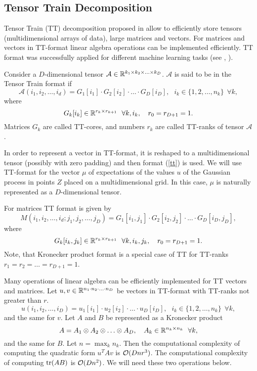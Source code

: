\subsection{Tensor Train Decomposition}
\label{tensor_train}

  Tensor Train (TT) decomposition proposed in \citet{oseledets2011} allow to
  efficiently store tensors (multidimensional arrays of data), large matrices and
  vectors. For matrices and vectors in TT-format linear algebra operations
  can be implemented efficiently. TT format was successfully applied for
  different machine learning tasks (see \citet{novikov2014}, \citet{novikov2015}).

  Consider a $D$-dimensional tensor $\mathcal A \in \mathbb{R}^{k_1 \times k_2 \times \ldots \times k_D}$.
  $\mathcal{A}$ is said to be in the Tensor Train format if
  \begin{equation}
  \label{tt}
    \mathcal{A}(i_1, i_2, \ldots, i_d) = G_1[i_1] \cdot G_2[i_2] \cdot \ldots \cdot G_D[i_D],~~~
    i_k \in \{1, 2, \ldots, n_k\}~~\forall k,
  \end{equation}
  where
  \[
    G_k[i_k] \in \mathbb{R}^{r_k\times r_{k+1}}~~\forall k, i_k,~~~r_0 = r_{D+1} = 1.
  \]
  Matrices $G_k$ are called TT-cores, and numbers $r_k$ are called TT-ranks of
  tensor $\mathcal{A}$.

  In order to represent a vector in TT-format, it is reshaped to a multidimensional
  tensor (possibly with zero padding) and then format (\ref{tt}) is used. We will
  use TT-format for the vector $\mu$ of expectations of the values $u$ of the
  Gaussian process in points $Z$ placed on a multidimensional grid. In this case,
  $\mu$ is naturally represented as a $D$-dimensional tensor.

  For matrices TT format is given by
  \[
    M(i_1, i_2, \ldots, i_d; j_1, j_2, \ldots, j_D) = G_1 [i_1, j_1] \cdot
    G_2[i_2, j_2] \cdot \ldots \cdot G_D[i_D, j_D],
  \]
  where
  \[
    G_k[i_k, j_k] \in \mathbb{R}^{r_k\times r_{k+1}}~~\forall k, i_k, j_k,~~~r_0 = r_{D+1} = 1.
  \]
  Note, that Kronecker product format is a special case of TT for TT-ranks
  $r_1 = r_2 = \ldots = r_{D+1} = 1$.

  Many operations of linear algebra can be efficiently implemented for TT vectors
  and matrices. Let $u, v \in \mathbb{R}^{n_1 \cdot n_2 \cdot \ldots \cdot n_D}$ be vectors
  in TT-format with TT-ranks not greater than $r$.
  \[
    u(i_1, i_2, \ldots, i_D) = u_1[i_1] \cdot u_2[i_2] \cdot \ldots \cdot u_D[i_D],~~~
    i_k \in \{1, 2, \ldots, n_k\}~~\forall k,
  \]
  and the same for $v$.
  Let $A$ and $B$ be represented as a Kronecker product
  \[
    A = A_1 \otimes A_2 \otimes \ldots \otimes A_D,~~~A_k \in \mathbb{R}^{n_k \times n_k}~~\forall k,
  \]
  and the same for $B$. Let $n = \max_k n_k$. Then the computational complexity
  of computing the quadratic form $u^T A v$ is $\mathcal{O}(Dnr^3)$. The computational
  complexity of computing $\mbox{tr}(AB)$ is $\mathcal{O}(Dn^2)$. We will need these two
  operations below.
